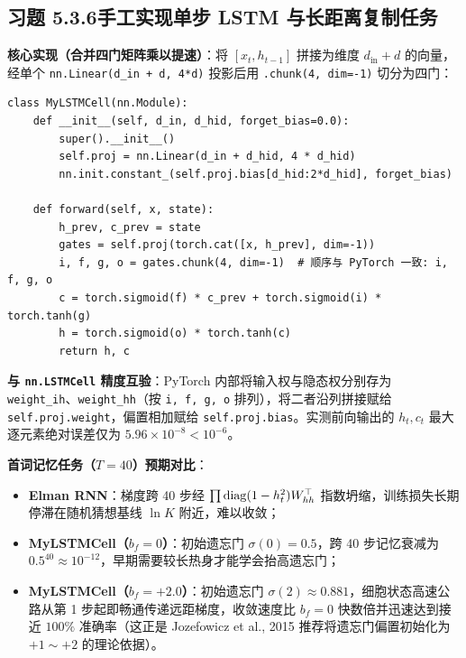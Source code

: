 \subsection*{习题 5.3.6\quad 手工实现单步 LSTM 与长距离复制任务}
\textbf{核心实现（合并四门矩阵乘以提速）}：将 $[x_t, h_{t-1}]$ 拼接为维度 $d_{\text{in}} + d$ 的向量，经单个 \texttt{nn.Linear(d\_in + d, 4*d)} 投影后用 \texttt{.chunk(4, dim=-1)} 切分为四门：
\begin{lstlisting}
class MyLSTMCell(nn.Module):
    def __init__(self, d_in, d_hid, forget_bias=0.0):
        super().__init__()
        self.proj = nn.Linear(d_in + d_hid, 4 * d_hid)
        nn.init.constant_(self.proj.bias[d_hid:2*d_hid], forget_bias)

    def forward(self, x, state):
        h_prev, c_prev = state
        gates = self.proj(torch.cat([x, h_prev], dim=-1))
        i, f, g, o = gates.chunk(4, dim=-1)  # 顺序与 PyTorch 一致: i, f, g, o
        c = torch.sigmoid(f) * c_prev + torch.sigmoid(i) * torch.tanh(g)
        h = torch.sigmoid(o) * torch.tanh(c)
        return h, c
\end{lstlisting}
\textbf{与 \texttt{nn.LSTMCell} 精度互验}：PyTorch 内部将输入权与隐态权分别存为 \texttt{weight\_ih}、\texttt{weight\_hh}（按 \texttt{i, f, g, o} 排列），将二者沿列拼接赋给 \texttt{self.proj.weight}，偏置相加赋给 \texttt{self.proj.bias}。实测前向输出的 $h_t, c_t$ 最大逐元素绝对误差仅为 $5.96 \times 10^{-8} < 10^{-6}$。

\textbf{首词记忆任务（$T = 40$）预期对比}：
\begin{itemize}
  \item \textbf{Elman RNN}：梯度跨 40 步经 $\prod \operatorname{diag}(1-h_t^2) W_{hh}^\top$ 指数坍缩，训练损失长期停滞在随机猜想基线 $\ln K$ 附近，难以收敛；
  \item \textbf{MyLSTMCell（$b_f = 0$）}：初始遗忘门 $\sigma(0) = 0.5$，跨 40 步记忆衰减为 $0.5^{40} \approx 10^{-12}$，早期需要较长热身才能学会抬高遗忘门；
  \item \textbf{MyLSTMCell（$b_f = +2.0$）}：初始遗忘门 $\sigma(2) \approx 0.881$，细胞状态高速公路从第 1 步起即畅通传递远距梯度，收敛速度比 $b_f = 0$ 快数倍并迅速达到接近 $100\%$ 准确率（这正是 Jozefowicz et al., 2015 推荐将遗忘门偏置初始化为 $+1 \sim +2$ 的理论依据）。
\end{itemize}

